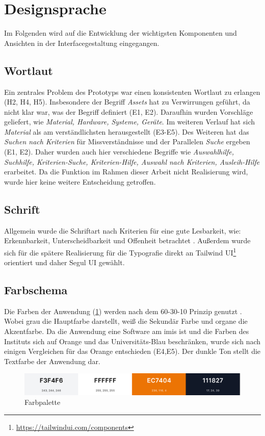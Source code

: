 \section{Designsprache}

Im Folgenden wird auf die Entwicklung der wichtigsten Komponenten und Ansichten in der
Interfacegestaltung eingegangen.

\subsection{Wortlaut}
Ein zentrales Problem des Prototyps war einen konsistenten Wortlaut zu erlangen (H2, H4, H5).
Insbesondere der Begriff \textit{Assets} hat zu Verwirrungen geführt, da nicht klar war, was der
Begriff definiert (E1, E2). Daraufhin wurden Vorschläge geliefert, wie \textit{Material, Hardware,
    Systeme, Geräte}. Im weiteren Verlauf hat sich \textit{Material} als am verständlichsten
herausgestellt (E3-E5). Des Weiteren hat das \textit{Suchen nach Kriterien} für Missverständnisse
und der Parallelen \textit{Suche} ergeben (E1, E2). Daher wurden auch hier verschiedene Begriffe wie
\textit{Auswahlhilfe, Suchhilfe, Kriterien-Suche, Kriterien-Hilfe, Auswahl nach Kriterien, Ausleih-Hilfe}
erarbeitet. Da die Funktion im Rahmen dieser Arbeit nicht Realisierung wird, wurde hier keine
weitere Entscheidung getroffen.

\subsection{Schrift}
Allgemein wurde die Schriftart nach Kriterien für eine gute Lesbarkeit, wie: Erkennbarkeit,
Unterscheidbarkeit und Offenheit betrachtet \cite{kommunikationsdesign_leserlichinfo}. Außerdem
wurde sich für die spätere Realisierung für die Typografie direkt an Tailwind
UI\footnote{\url{https://tailwindui.com/components}} orientiert und daher Segul UI gewählt.


\subsection{Farbschema}
Die Farben der Anwendung (\ref{fig:farben}) werden nach dem 60-30-10 Prinzip genutzt
\cite{experience_using}. Wobei grau die Hauptfarbe darstellt, weiß die Sekundär Farbe und organe die
Akzentfarbe. Da die Anwendung eine Software am \ac{imis} ist und die Farben des Instituts sich auf
Orange und das Universitäts-Blau beschränken, wurde sich nach einigen Vergleichen für das Orange
entschieden (E4,E5). Der dunkle Ton stellt die Textfarbe der Anwendung dar.
\begin{figure}[h]
    \centering
    \includegraphics[scale=0.23]{Bilder/farben.png}
    \caption[Farbpalette]{Farbpalette}
    \label{fig:farben}
\end{figure}

